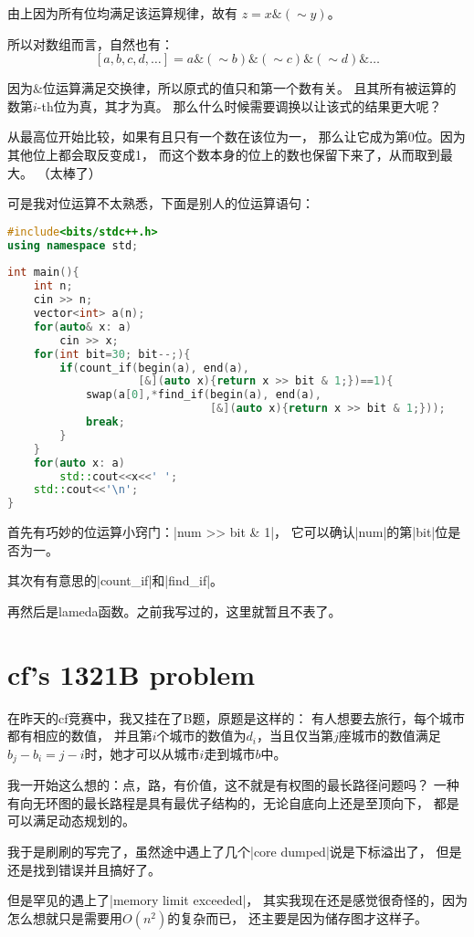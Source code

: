 由上因为所有位均满足该运算规律，故有
$z=x\&(\sim y)$。

所以对数组而言，自然也有：
$$[a, b, c, d, \ldots] = a\&(\sim b)\&(\sim c)\&(\sim d)\&\ldots$$

因为$\&$位运算满足交换律，所以原式的值只和第一个数有关。
且其所有被运算的数第$i$-th位为真，其才为真。
那么什么时候需要调换以让该式的结果更大呢？

从最高位开始比较，如果有且只有一个数在该位为一，
那么让它成为第0位。因为其他位上都会取反变成1，
而这个数本身的位上的数也保留下来了，从而取到最大。
（太棒了）

可是我对位运算不太熟悉，下面是别人的位运算语句：
\begin{lstlisting}[language=C++]
#include<bits/stdc++.h>
using namespace std;
 
int main(){
    int n;
    cin >> n;
    vector<int> a(n);
    for(auto& x: a)
        cin >> x;
    for(int bit=30; bit--;){
        if(count_if(begin(a), end(a),
                    [&](auto x){return x >> bit & 1;})==1){
            swap(a[0],*find_if(begin(a), end(a),
                               [&](auto x){return x >> bit & 1;}));
            break;
        }
    }
    for(auto x: a)
        std::cout<<x<<' ';
    std::cout<<'\n';
}
\end{lstlisting}

首先有巧妙的位运算小窍门：\vb|num >> bit & 1|，
它可以确认\vb|num|的第\vb|bit|位是否为一。

其次有有意思的\vb|count_if|和\vb|find_if|。

再然后是lameda函数。之前我写过的，这里就暂且不表了。


\section{cf's 1321B problem}

在昨天的cf竞赛中，我又挂在了B题，原题是这样的：
有人想要去旅行，每个城市都有相应的数值，
并且第$i$个城市的数值为$d_i$，当且仅当第$j$座城市的数值满足
$b_j-b_i=j-i$时，她才可以从城市$i$走到城市$b$中。

我一开始这么想的：点，路，有价值，这不就是有权图的最长路径问题吗？
一种有向无环图的最长路程是具有最优子结构的，无论自底向上还是至顶向下，
都是可以满足动态规划的。

我于是刷刷的写完了，虽然途中遇上了几个\vb|core dumped|说是下标溢出了，
但是还是找到错误并且搞好了。

但是罕见的遇上了\vb|memory limit exceeded|，
其实我现在还是感觉很奇怪的，因为怎么想就只是需要用$O(n^2)$的复杂而已，
还主要是因为储存图才这样子。

